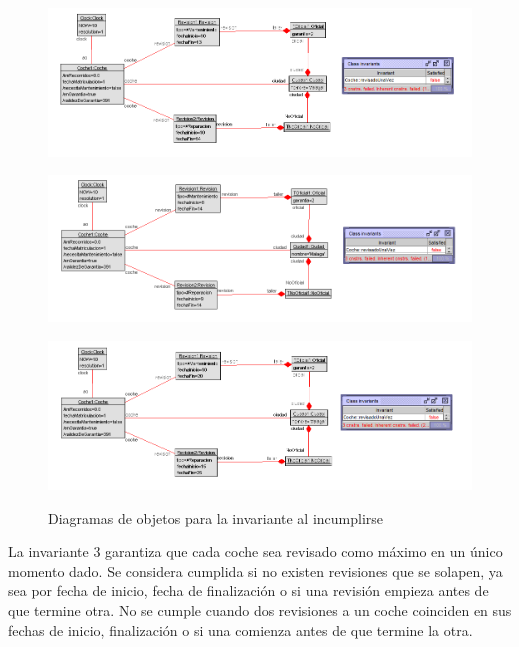 \documentclass[12pt.a4paper]{article}
\begin{document}
    
   \begin{figure}[H]
    \centering
    \begin{minipage}{0.49\textwidth}
        \centering
        \includegraphics[width=\linewidth]{Soils/3_v2.png}
        \label{fig:diagrama1}
    \end{minipage}
    \hfill
    \begin{minipage}{0.49\textwidth}
        \centering
        \includegraphics[width=\linewidth]{Soils/3_v3.png}
        \label{fig:diagrama2}
    \end{minipage}
    \hfill
        \centering
        \includegraphics[width=0.7\linewidth]{Soils/3_v4.png}
        \label{fig:diagrama3}
    \caption{Diagramas de objetos para la invariante al incumplirse}
    \label{fig:Diagrama_incumplimiento}
\end{figure}


La invariante 3 garantiza que cada coche sea revisado como máximo en un único momento dado. Se considera cumplida si no existen revisiones que se solapen, ya sea por fecha de inicio, fecha de finalización o si una revisión empieza antes de que termine otra. No se cumple cuando dos revisiones a un coche coinciden en sus fechas de inicio, finalización o si una comienza antes de que termine la otra.
\end{document}
